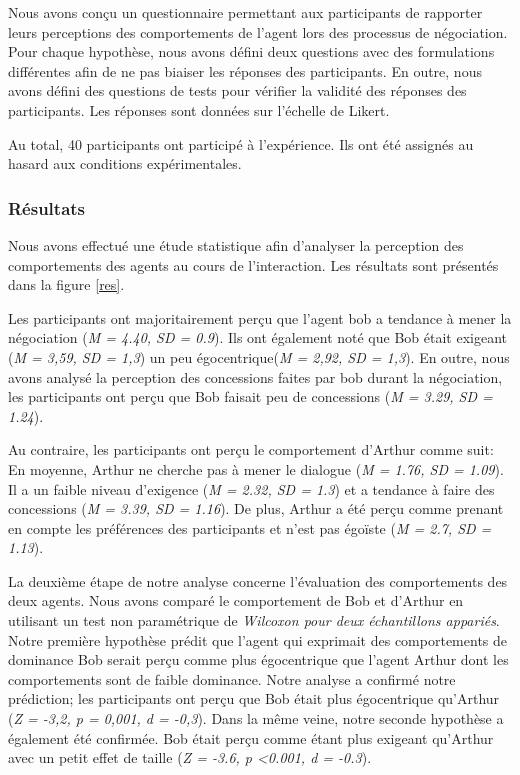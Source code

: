 {			Nous avons conçu un questionnaire permettant aux participants de rapporter leurs perceptions des comportements de l'agent lors des processus de négociation. Pour chaque hypothèse, nous avons défini deux questions avec des formulations différentes afin de ne pas biaiser les réponses des participants. En outre, nous avons défini des questions de tests pour vérifier la validité des réponses des participants. Les réponses sont données sur l'échelle de Likert.
			
			Au total, 40 participants ont participé à l'expérience. Ils ont été assignés au hasard aux conditions expérimentales.
			
			\subsubsection{Résultats}
			Nous avons effectué une étude statistique afin d'analyser la perception des comportements des agents au cours de l'interaction. Les résultats sont présentés dans la figure \ref{res}.
			
			Les participants ont majoritairement perçu que l'agent bob a tendance à mener la négociation (\emph {M = 4.40, SD = 0.9}). Ils ont également noté que Bob était exigeant (\emph {M = 3,59, SD = 1,3}) un peu égocentrique(\emph {M = 2,92, SD = 1,3}). En outre, nous avons analysé la perception des concessions faites par bob durant la négociation, les participants ont perçu que Bob faisait peu de concessions (\emph {M = 3.29, SD = 1.24}).
			
			Au contraire, les participants ont perçu le comportement d'Arthur comme suit: En moyenne, Arthur ne cherche pas à mener le dialogue (\emph {M = 1.76, SD = 1.09}). Il a un faible niveau d'exigence (\emph {M = 2.32, SD = 1.3}) et a tendance à faire des concessions (\emph {M = 3.39, SD = 1.16}). De plus, Arthur a été perçu comme prenant en compte les préférences des participants et n'est pas égoïste (\emph {M = 2.7, SD = 1.13}).
			
			La deuxième étape de notre analyse concerne l'évaluation des comportements des deux agents. Nous avons comparé le comportement de Bob et d'Arthur en utilisant un test non paramétrique de \emph{Wilcoxon pour deux échantillons appariés}. Notre première hypothèse prédit que l'agent qui exprimait des comportements de dominance Bob serait perçu comme plus égocentrique que l'agent Arthur dont les comportements sont de faible dominance. Notre analyse a confirmé notre prédiction; les participants ont perçu que Bob était plus égocentrique qu'Arthur (\emph {Z = -3,2, p = 0,001, d = -0,3}). Dans la même veine, notre seconde hypothèse a également été confirmée. Bob était perçu comme étant plus exigeant qu'Arthur avec un petit effet de taille (\emph {Z = -3.6, p <0.001, d = -0.3}).
			
}
